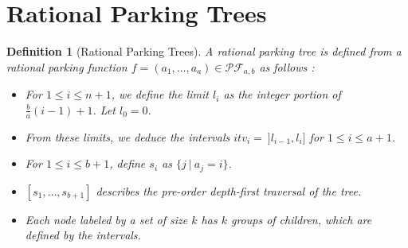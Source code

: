 \documentclass[12pt]{report}
\newtheorem{definition}{Definition}
\begin{document}
\section{Rational Parking Trees}

\begin{definition}[Rational Parking Trees]
    A \emph{rational parking tree} is defined from a 
    rational parking function $f = (a_1, \ldots, a_a) 
    \in \mathcal{PF}_{a,b}$ as follows :
    \begin{itemize}
        \item For $1 \leqslant i \leqslant n+1$, we define
            the limit $l_i$ as the \emph{integer portion}
            of $\displaystyle \frac{b}{a}(i-1) + 1$.
            \subitem Let $l_0 = 0$.
        \item From these limits, we deduce the intervals
            $itv_i =\ ]l_{i-1}, l_i]$ for $1 \leqslant i
            \leqslant a+1$.
        \item For $1 \leqslant i \leqslant b + 1$, define
        $s_i$ as $\{j\ |\ a_j = i\}$.
        \item $[s_1, \ldots, s_{b+1}]$ describes the
        pre-order depth-first traversal of the tree.
        \item Each node labeled by a set of size $k$
            has $k$ \emph{groups} of children, which are
            defined by the intervals. 
    \end{itemize}
\end{definition}
\end{document}
